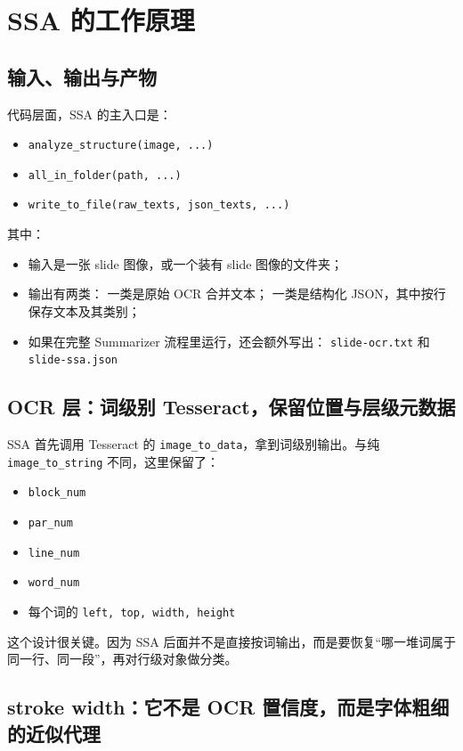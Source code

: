 \documentclass[a4paper]{article}
\begin{document}
\section{SSA 的工作原理}

\subsection{输入、输出与产物}

代码层面，SSA 的主入口是：

\begin{itemize}
\item \texttt{analyze\_structure(image, ...)}
\item \texttt{all\_in\_folder(path, ...)}
\item \texttt{write\_to\_file(raw\_texts, json\_texts, ...)}
\end{itemize}

其中：

\begin{itemize}
\item 输入是一张 slide 图像，或一个装有 slide 图像的文件夹；
\item 输出有两类：
  一类是原始 OCR 合并文本；
  一类是结构化 JSON，其中按行保存文本及其类别；
\item 如果在完整 Summarizer 流程里运行，还会额外写出：
  \texttt{slide-ocr.txt} 和 \texttt{slide-ssa.json}
\end{itemize}

\subsection{OCR 层：词级别 Tesseract，保留位置与层级元数据}

SSA 首先调用 Tesseract 的 \texttt{image\_to\_data}，拿到词级别输出。与纯 \texttt{image\_to\_string} 不同，这里保留了：

\begin{itemize}
\item \texttt{block\_num}
\item \texttt{par\_num}
\item \texttt{line\_num}
\item \texttt{word\_num}
\item 每个词的 \texttt{left, top, width, height}
\end{itemize}

这个设计很关键。因为 SSA 后面并不是直接按词输出，而是要恢复“哪一堆词属于同一行、同一段”，再对行级对象做分类。

\subsection{stroke width：它不是 OCR 置信度，而是字体粗细的近似代理}
\end{document}
